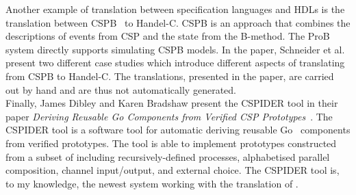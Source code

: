 Another example of translation between specification languages and HDLs is the translation between CSP\textbar\textbar B~\cite{Schneider2002a} to Handel-C. CSP\textbar\textbar B is an approach that combines the descriptions of events from CSP and the state from the B-method. The ProB system\cite{ProB}\cite{Leuschel2003} directly supports simulating CSP\textbar\textbar B models. In the paper,  Schneider et al. present two different case studies which introduce different aspects of translating from CSP\textbar\textbar B to Handel-C. The translations, presented in the paper, are carried out by hand and are thus not automatically generated.\\

Finally, James Dibley and Karen Bradshaw present the CSPIDER tool in their paper \textit{Deriving Reusable Go Components from Verified CSP Prototypes}~\cite{Dibley2018}. The CSPIDER tool is a software tool for automatic deriving reusable Go~\cite{Go} components from verified \cspm{} prototypes. The tool is able to implement prototypes constructed from a subset of \cspm{} including recursively-defined processes, alphabetised parallel composition, channel input/output, and external choice. The CSPIDER tool is, to my knowledge, the newest system working with the translation of \cspm{}.
